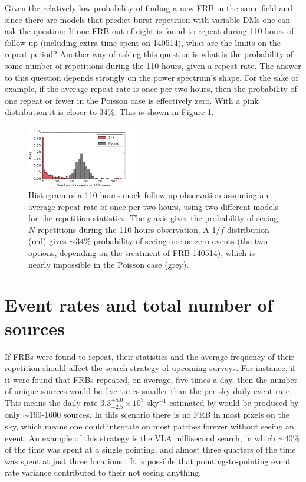 \documentclass[useAMS,usenatbib]{mn2e}
\begin{document}
Given the relatively low probability of finding 
a new FRB in the same field and since there are models that predict
burst repetition with variable DMs \citep{2015arXiv150505535C, 2015arXiv150701002M}
one can ask the question: If one FRB out of eight is found to
repeat during 110 hours of follow-up (including extra time spent on 140514), 
what are the limits on the
repeat period? Another way of asking this question is what is the probability of 
 some number of repetitions during the 110 hours, given a repeat rate. The answer to 
this question depends strongly on the power spectrum's shape. For the sake of example, if the average 
repeat rate is once per two hours, then the probability of one repeat or fewer in the Poisson
case is effectively zero. With a pink distribution it is closer to $34\%$. This is 
shown in Figure \ref{FIG-hist}. 

\begin{figure}
  \centering
   \includegraphics[trim={0in, 0in, 0in, 0in}, width=0.43\textwidth, height=0.22\textwidth]{110_hours_followup.png}
   \caption{Histogram of a 110-hours mock follow-up observation assuming an average repeat rate of 
   once per two hours, using two different models 
   for the repetition statistics. The $y$-axis gives the probability of seeing 
   $N$ repetitions during the 110-hours observation.
   A 1$/f$ distribution (red) gives $\sim34\%$ probability of seeing one or zero events 
   (the two options, depending on the treatment of FRB 140514), 
   which is nearly impossible in the Poisson case (grey).}
   \label{FIG-hist}
\end{figure}


\section{Event rates and total number of sources}
\label{rate}

If FRBs were found to repeat, their statistics and the
average frequency of their repetition 
should affect the search strategy of upcoming surveys. 
For instance, if it were found that FRBs repeated,
on average, five times a day, then the number of unique 
sources would be five times smaller than the per-sky 
daily event rate. This means the daily rate 
$3.3^{+5.0}_{-2.5}\times10^3$ sky$^{-1}$ estimated by 
\cite{2015arXiv150500834R} would be produced by
only $\sim$160-1600 sources. In this scenario 
there is no FRB in most pixels on the sky, which means
one could integrate on most patches forever without 
seeing an event. An example of this strategy is the VLA millisecond search, 
in which $\sim40\%$ of the time was spent at a single pointing, and
almost three quarters of the time was spent at just three locations \citep{2015ApJ...807...16L}.
It is possible that pointing-to-pointing event rate variance contributed 
to their not seeing anything.
\end{document}
